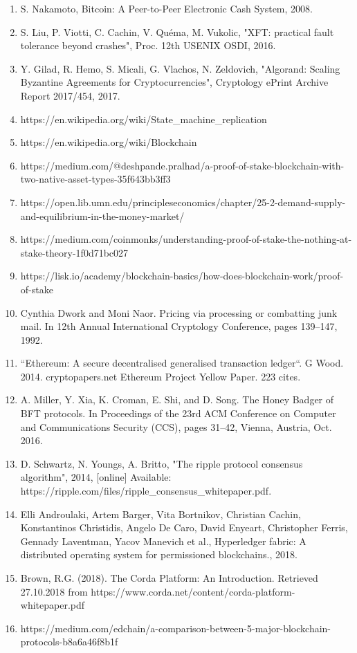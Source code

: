 \documentclass[12pt, a4paper, oneside]{Thesis} %
\begin{document}
\begin{enumerate}
    \item S. Nakamoto, Bitcoin: A Peer-to-Peer Electronic Cash System, 2008.
    \item S. Liu, P. Viotti, C. Cachin, V. Quéma, M. Vukolic, "XFT: practical fault tolerance beyond crashes", Proc. 12th USENIX OSDI, 2016.
    \item Y. Gilad, R. Hemo, S. Micali, G. Vlachos, N. Zeldovich, "Algorand: Scaling Byzantine Agreements for Cryptocurrencies", Cryptology ePrint Archive Report 2017/454, 2017.
    \item https://en.wikipedia.org/wiki/State\_machine\_replication
    \item https://en.wikipedia.org/wiki/Blockchain
    \item https://medium.com/@deshpande.pralhad/a-proof-of-stake-blockchain-with-two-native-asset-types-35f643bb3ff3
    \item https://open.lib.umn.edu/principleseconomics/chapter/25-2-demand-supply-and-equilibrium-in-the-money-market/
    \item https://medium.com/coinmonks/understanding-proof-of-stake-the-nothing-at-stake-theory-1f0d71bc027
    \item https://lisk.io/academy/blockchain-basics/how-does-blockchain-work/proof-of-stake
    \item Cynthia Dwork and Moni Naor. Pricing via processing or combatting junk mail. In 12th Annual International Cryptology Conference, pages 139–147, 1992.
    \item “Ethereum: A secure decentralised generalised transaction ledger“. G Wood. 2014. cryptopapers.net Ethereum Project Yellow Paper. 223 cites.
    \item A. Miller, Y. Xia, K. Croman, E. Shi, and D. Song. The Honey Badger of BFT protocols. In Proceedings of the 23rd ACM Conference on Computer and Communications Security (CCS), pages 31–42, Vienna, Austria, Oct. 2016.
    \item D. Schwartz, N. Youngs, A. Britto, "The ripple protocol consensus algorithm", 2014, [online] Available: https://ripple.com/files/ripple\_consensus\_whitepaper.pdf.
    \item Elli Androulaki, Artem Barger, Vita Bortnikov, Christian Cachin, Konstantinos Christidis, Angelo De Caro, David Enyeart, Christopher Ferris, Gennady Laventman, Yacov Manevich et al., Hyperledger fabric: A distributed operating system for permissioned blockchains., 2018.
    \item Brown, R.G. (2018). The Corda Platform: An Introduction. Retrieved 27.10.2018 from https://www.corda.net/content/corda-platform-whitepaper.pdf
    \item https://medium.com/edchain/a-comparison-between-5-major-blockchain-protocols-b8a6a46f8b1f
\end{enumerate}
\end{document}
